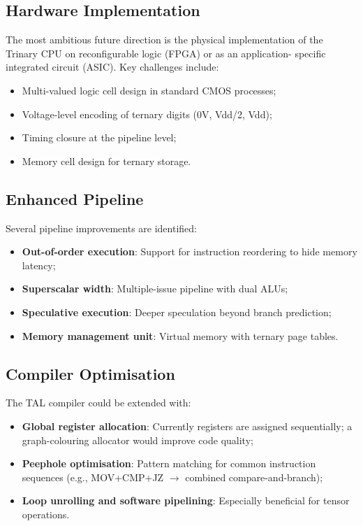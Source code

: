 \documentclass[12pt,a4paper,twoside]{book}
\theoremstyle{trinarytheorem}
\theoremstyle{trinarydefinition}
\begin{document}
\subsection{Hardware Implementation}

The most ambitious future direction is the physical implementation of
the Trinary CPU on reconfigurable logic (FPGA) or as an application-
specific integrated circuit (ASIC). Key challenges include:
\begin{itemize}
    \item Multi-valued logic cell design in standard CMOS processes;
    \item Voltage-level encoding of ternary digits (0V, Vdd/2, Vdd);
    \item Timing closure at the pipeline level;
    \item Memory cell design for ternary storage.
\end{itemize}

\subsection{Enhanced Pipeline}

Several pipeline improvements are identified:
\begin{itemize}
    \item \textbf{Out-of-order execution}: Support for instruction
          reordering to hide memory latency;
    \item \textbf{Superscalar width}: Multiple-issue pipeline with
          dual ALUs;
    \item \textbf{Speculative execution}: Deeper speculation beyond
          branch prediction;
    \item \textbf{Memory management unit}: Virtual memory with
          ternary page tables.
\end{itemize}

\subsection{Compiler Optimisation}

The TAL compiler could be extended with:
\begin{itemize}
    \item \textbf{Global register allocation}: Currently registers
          are assigned sequentially; a graph-colouring allocator would
          improve code quality;
    \item \textbf{Peephole optimisation}: Pattern matching for common
          instruction sequences (e.g., MOV+CMP+JZ $\rightarrow$ combined
          compare-and-branch);
    \item \textbf{Loop unrolling and software pipelining}: Especially
          beneficial for tensor operations.
\end{itemize}
\end{document}
